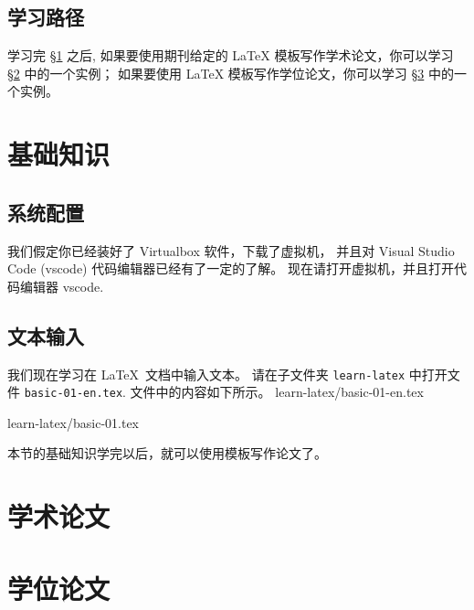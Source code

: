 \documentclass[
    11pt,
    cite=authoryear,
    device=phone,
    lang=cn,
    mode=simple,
    result=answer,
    toc=onecol,
]{elegantbook_sierxue}
\begin{document}
\subsection*{学习路径}%
\label{sec:latex-learning}

学习完 \S\ref{sec:latex-basic} 之后,
如果要使用期刊给定的 \LaTeX{} 模板写作学术论文，你可以学习
\S\ref{sec:latex-paper} 中的一个实例；
如果要使用 \LaTeX{} 模板写作学位论文，你可以学习
\S\ref{sec:latex-thesis} 中的一个实例。

\section{基础知识}%
\label{sec:latex-basic}

\subsection*{系统配置}%
\label{sub:vm-vscode}

我们假定你已经装好了 Virtualbox 软件，下载了虚拟机，
并且对 Visual Studio Code (vscode) 代码编辑器已经有了一定的了解。
现在请打开虚拟机，并且打开代码编辑器 vscode.

\subsection{文本输入}%
\label{sub:latex-text}

我们现在学习在 \LaTeX\ 文档中输入文本。
请在子文件夹 \lstinline{learn-latex} 中打开文件
\lstinline{basic-01-en.tex}.
文件中的内容如下所示。
%
{learn-latex/basic-01-en.tex}


\lstset{numbers=left,frame=none}
%
{learn-latex/basic-01.tex}

本节的基础知识学完以后，就可以使用模板写作论文了。

\section{学术论文}%
\label{sec:latex-paper}

\section{学位论文}%
\label{sec:latex-thesis}
\end{document}
